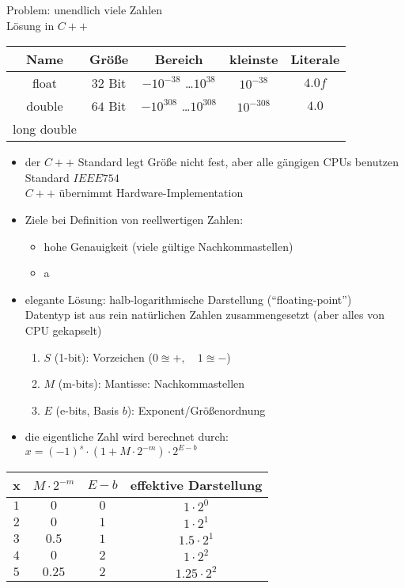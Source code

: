 \documentclass{article}
\begin{document}
Problem: unendlich viele Zahlen \\
Lösung in $C++$
	\begin{tabular} {c|c|c|c|c}
		Name & Größe & Bereich & kleinste & Literale\\ \hline
		float & $32$ Bit & $-10^{-38}$ \dots $10^{38}$ & $10^{-38}$ & $4.0f$ \\
		double & $64$ Bit & $-10^{308}$ \dots $10^{308}$ & $10^{-308}$ & $4.0$ \\
		long double &  &  &  & \\
	\end{tabular}
	\begin{itemize}
	\item der $C++$ Standard legt Größe nicht fest, aber alle gängigen CPUs benutzen Standard $IEEE 754$ \\
	$C++$ übernimmt Hardware-Implementation
	\item Ziele bei Definition von reellwertigen Zahlen:
	\begin{itemize}
		\item hohe Genauigkeit (viele gültige Nachkommastellen)
		\item a
	\end{itemize}
	\item elegante Lösung: halb-logarithmische Darstellung (``floating-point'') \\
	Datentyp ist aus rein natürlichen Zahlen zusammengesetzt (aber alles von CPU gekapselt)
	\begin{enumerate}
		\item $S$ (1-bit): Vorzeichen ($0 \approxeq +, \quad 1 \approxeq -$)
		\item $M$ (m-bits): Mantisse: Nachkommastellen
		\item $E$ (e-bits, Basis $b$): Exponent/Größenordnung
	\end{enumerate}
	\item die eigentliche Zahl wird berechnet durch: \\
		$x = (-1)^s \cdot (1+M \cdot 2^{-m}) \cdot 2^{E-b}$
	\end{itemize}
	\begin{tabular} {c|c|c|c}
		x & $M \cdot 2^{-m}$ & $E-b$ & effektive Darstellung \\ \hline
		$1$ & $0$ & $0$ & $1 \cdot 2^0 $ \\
		$2$ & $0$ & $1$ & $1 \cdot 2^1 $ \\
		$3$ & $0.5$ & $1$ & $1.5 \cdot 2^1 $ \\
		$4$ & $0$ & $2$ & $1 \cdot 2^2 $\\
		$5$ & $0.25$ & $2$ & $1.25 \cdot 2^2 $ \\
	\end{tabular}
\end{document}
